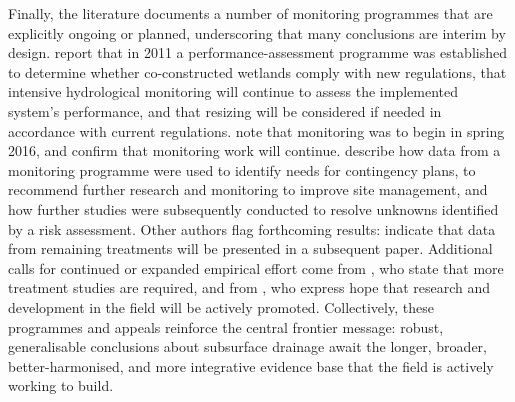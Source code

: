 \documentclass[11pt]{article}
\begin{document}
Finally, the literature documents a number of monitoring programmes that are explicitly ongoing or planned, underscoring that many conclusions are interim by design. \textcite{Tournebize2012} report that in 2011 a performance-assessment programme was established to determine whether co-constructed wetlands comply with new regulations, that intensive hydrological monitoring will continue to assess the implemented system's performance, and that resizing will be considered if needed in accordance with current regulations. \textcite{Kjaersgaard2016} note that monitoring was to begin in spring 2016, and \textcite{Ali2001} confirm that monitoring work will continue. \textcite{Ohlendorf2002} describe how data from a monitoring programme were used to identify needs for contingency plans, to recommend further research and monitoring to improve site management, and how further studies were subsequently conducted to resolve unknowns identified by a risk assessment. Other authors flag forthcoming results: \textcite{Drury2014} indicate that data from remaining treatments will be presented in a subsequent paper. Additional calls for continued or expanded empirical effort come from \textcite{Rekha2011}, who state that more treatment studies are required, and from \textcite{Ogino2007}, who express hope that research and development in the field will be actively promoted. Collectively, these programmes and appeals reinforce the central frontier message: robust, generalisable conclusions about subsurface drainage await the longer, broader, better-harmonised, and more integrative evidence base that the field is actively working to build.

\printbibliography
\end{document}
